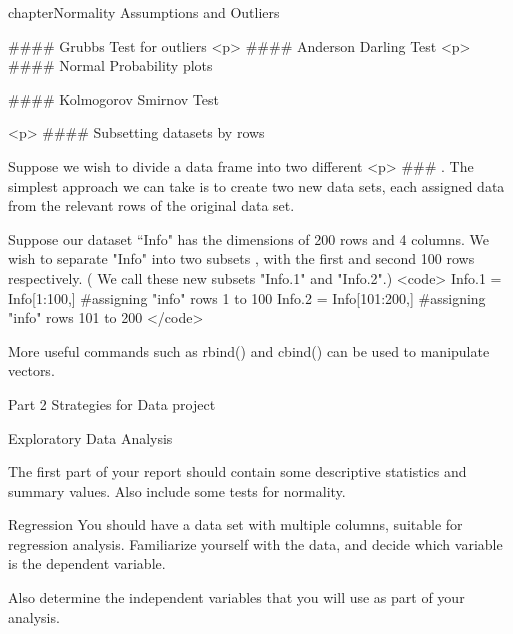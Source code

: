 

chapter{Normality Assumptions and Outliers}

#### {Grubbs Test for outliers}
<p>
#### {Anderson Darling Test}
<p>
#### {Normal Probability plots}

#### { Kolmogorov Smirnov Test}






<p>
#### {Subsetting datasets by rows}

Suppose we wish to divide a data frame into two different <p>
### . The simplest approach we can take is to create two new data sets, each assigned data from the relevant rows of the original data set.

Suppose our dataset ``Info" has the dimensions of 200 rows and 4 columns. We wish to separate "Info" into two subsets , with the first and second 100 rows respectively. ( We call these new subsets "Info.1" and "Info.2".)
<code>
Info.1 = Info[1:100,]		#assigning "info" rows 1 to 100
Info.2 = Info[101:200,]		#assigning "info" rows 101 to 200
</code>

More useful commands such as rbind() and cbind()  can be used to manipulate vectors.

Part 2 Strategies for Data project

Exploratory Data Analysis

The first part of your report should contain some descriptive statistics and summary values. Also include some tests for normality.

      {Regression}
You should have a data set with multiple columns, suitable for regression analysis.
Familiarize yourself with the data, and decide which variable is the dependent variable.

Also determine the independent variables that you will use as part of your analysis.

  
